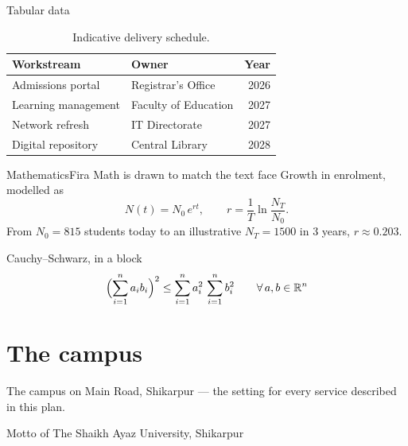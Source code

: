 \documentclass[aspectratio=169,11pt]{beamer}
\begin{document}
\begin{frame}{Tabular data}
  \begin{table}
    \centering
    \begin{tabular}{@{}llr@{}}
      \toprule
      \textbf{Workstream} & \textbf{Owner} & \textbf{Year} \\
      \midrule
      Admissions portal   & Registrar's Office & 2026 \\
      Learning management & Faculty of Education & 2027 \\
      Network refresh     & IT Directorate & 2027 \\
      Digital repository  & Central Library & 2028 \\
      \bottomrule
    \end{tabular}
    \caption{Indicative delivery schedule.}
  \end{table}
\end{frame}

\begin{frame}{Mathematics}{Fira Math is drawn to match the text face}
  Growth in enrolment, modelled as
  \[
    N(t) = N_0\,e^{rt}, \qquad r = \frac{1}{T}\ln\frac{N_T}{N_0}.
  \]
  From $N_0 = 815$ students today to an illustrative $N_T = 1500$ in 3 years,
  $r \approx 0.203$.

  \begin{exampleblock}{Cauchy--Schwarz, in a block}
    \[
      \Bigl(\sum_{i=1}^{n} a_i b_i\Bigr)^{2}
      \le \sum_{i=1}^{n} a_i^{2} \, \sum_{i=1}^{n} b_i^{2}
      \qquad \forall\, a, b \in \mathbb{R}^n
    \]
  \end{exampleblock}
\end{frame}

\section{The campus}

\begin{frame}
    {The campus on Main Road, Shikarpur --- the setting for every service
     described in this plan.}
\end{frame}

\begin{frame}
    {Motto of The Shaikh Ayaz University, Shikarpur}
\end{frame}
\end{document}
